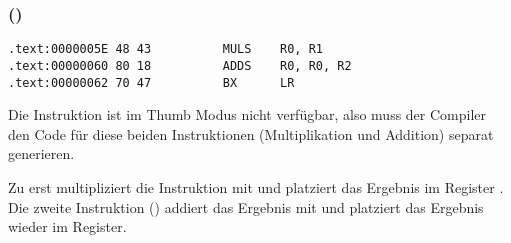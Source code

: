 \subsubsection{\OptimizingKeilVI (\ThumbMode)}

\begin{lstlisting}[label=ARM_leaf_example2]
.text:0000005E 48 43          MULS    R0, R1
.text:00000060 80 18          ADDS    R0, R0, R2
.text:00000062 70 47          BX      LR
\end{lstlisting}

Die  Instruktion ist im Thumb Modus nicht verfügbar, also muss der Compiler den Code für diese
beiden Instruktionen (Multiplikation und Addition) separat generieren. 


Zu erst multipliziert die  Instruktion  mit  und platziert das Ergebnis im Register .
Die zweite Instruktion () addiert das Ergebnis mit  und platziert das Ergebnis wieder im  Register.


